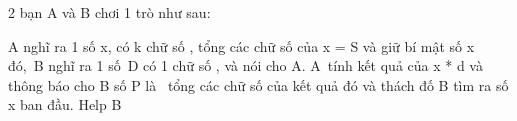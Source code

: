 2 bạn A và B chơi 1 trò như sau:  

   A nghĩ ra 1 số x, có k chữ số , tổng các chữ số của x = S và giữ bí mật số x đó, B nghĩ ra 1 số D có 1 chữ số , và nói cho A. A tính kết quả của x * d và thông báo cho B số P là  tổng các chữ số của kết quả đó và thách đố B tìm ra số x ban đầu. Help B  

\
